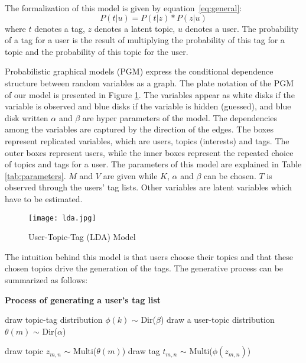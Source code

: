 The formalization of this model is given by equation~\ref{eq:general}: 
\begin{equation}
P(t|u)=P(t|z)*P(z|u)
\label{eq:general}
\end{equation}
where $t$ denotes a tag, $z$ denotes a latent topic, $u$ denotes a user. The probability of a tag for a user is the result of multiplying the probability of this tag for a topic and the probability of this topic for the user.

Probabilistic graphical models (PGM) express the conditional dependence structure between random variables as a graph. 
The plate notation of the PGM of our model is presented in Figure \ref{fig:lda}. 
The variables appear as white disks if the variable is observed and blue disks if the variable is hidden (guessed), and blue disk written $\alpha$ and $\beta$ are hyper parameters of the model.
The dependencies among the variables are captured by the direction of the edges. 
The boxes represent replicated variables, which are users, topics (interests) and tags. 
The outer boxes represent users, while the inner boxes represent the repeated choice of topics and tags for a user. 
The parameters of this model are explained in Table \ref{tab:parameters}.
$M$ and $V$ are given while $K$, $\alpha$ and $\beta$ can be chosen. $T$ is observed through the users' tag lists. Other variables are latent variables which have to be estimated.

\begin{figure}[htbp]\centering
\texttt{[image: lda.jpg]}  %
\caption{User-Topic-Tag (LDA) Model}
\label{fig:lda}
\end{figure}

The intuition behind this model is that users choose their topics and that these chosen topics drive the generation of the tags.
The generative process can be summarized as follows:

\begin{algorithm}%
\begin{algorithmic}[1]
\label{algo:algoldagenerateprocess}
\State \textbf{Process of generating a user’s tag list} 

\State draw topic-tag distribution $\phi(k)$ $\sim$ Dir($\beta$)
\EndFor
{}
\State draw a user-topic distribution $\theta(m)$ $\sim$ Dir($\alpha$)
\EndFor
{}

\State draw topic $z_{m,n}$  $\sim$ Multi($\theta(m)$)
\State draw tag $t_{m,n}$ $\sim$ Multi($\phi(z_{m,n})$)

\EndFor
\end{algorithmic}
\end{algorithm}



